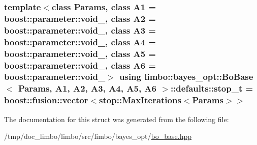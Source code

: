 \subsubsection[{\texorpdfstring{stop\+\_\+t}{stop_t}}]{\setlength{\rightskip}{0pt plus 5cm}template$<$class Params, class A1 = boost\+::parameter\+::void\+\_\+, class A2 = boost\+::parameter\+::void\+\_\+, class A3 = boost\+::parameter\+::void\+\_\+, class A4 = boost\+::parameter\+::void\+\_\+, class A5 = boost\+::parameter\+::void\+\_\+, class A6 = boost\+::parameter\+::void\+\_\+$>$ using {\bf limbo\+::bayes\+\_\+opt\+::\+Bo\+Base}$<$ Params, A1, A2, A3, A4, A5, A6 $>$\+::{\bf defaults\+::stop\+\_\+t} =  boost\+::fusion\+::vector$<${\bf stop\+::\+Max\+Iterations}$<$Params$>$$>$}\hypertarget{structlimbo_1_1bayes__opt_1_1_bo_base_1_1defaults_aabb9a88029b7b3cba6d1bafe3dfadaf5}{}\label{structlimbo_1_1bayes__opt_1_1_bo_base_1_1defaults_aabb9a88029b7b3cba6d1bafe3dfadaf5}


The documentation for this struct was generated from the following file\+:\begin{DoxyCompactItemize}
\item 
/tmp/doc\+\_\+limbo/limbo/src/limbo/bayes\+\_\+opt/\hyperlink{bo__base_8hpp}{bo\+\_\+base.\+hpp}\end{DoxyCompactItemize}
